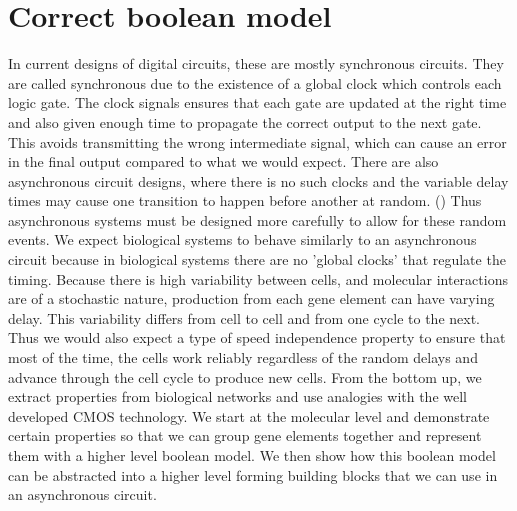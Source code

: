 \documentclass{article}
\begin{document}
\section{Correct boolean model}
In current designs of digital circuits, these are mostly synchronous circuits.  They are called synchronous due to the existence of a global clock which controls each logic gate.  The clock signals ensures that each gate are updated at the right time and also given enough time to propagate the correct output to the next gate. This avoids transmitting the wrong intermediate signal, which can cause an error in the final output compared to what we would expect.  There are also asynchronous circuit designs, where there is no such clocks and the variable delay times may cause one transition to happen before another at random. ()  Thus asynchronous systems must be designed more carefully to allow for these random events.  We expect biological systems to behave similarly to an asynchronous circuit because in biological systems there are no 'global clocks' that regulate the timing.  Because there is high variability between cells, and molecular interactions are of a stochastic nature, production from each gene element can have varying delay.  This variability differs from cell to cell and from one cycle to the next. Thus we would also expect a type of speed independence property to ensure that most of the time, the cells work reliably regardless of the random delays and advance through the cell cycle to produce new cells.
\newline \newline
From the bottom up, we extract properties from biological networks and use analogies with the well developed CMOS technology.  We start at the molecular level and demonstrate certain properties so that we can group gene elements together and represent them with a higher level boolean model.  We then show how this boolean model can be abstracted into a higher level forming building blocks that we can use in an asynchronous circuit. 
\newline \newline
\end{document}
